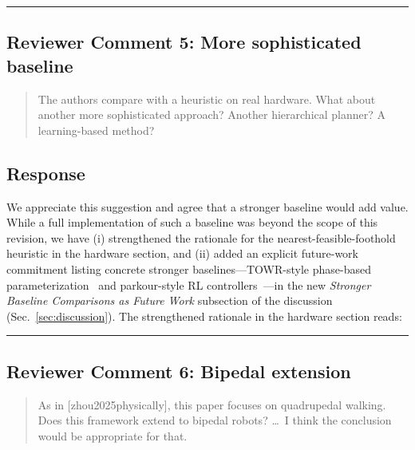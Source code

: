 \noindent\rule{17cm}{2.0pt}

\subsection{Reviewer Comment 5: More sophisticated baseline}
\begin{mdframed}
\begin{quote}
The authors compare with a heuristic on real hardware. What about another more sophisticated approach? Another hierarchical planner? A learning-based method?
\end{quote}
\end{mdframed}

\subsection{Response}
We appreciate this suggestion and agree that a stronger baseline would add value. While a full implementation of such a baseline was beyond the scope of this revision, we have (i) strengthened the rationale for the nearest-feasible-foothold heuristic in the hardware section, and (ii) added an explicit future-work commitment listing concrete stronger baselines---TOWR-style phase-based parameterization~\citep{winkler2018gait} and parkour-style RL controllers~\citep{zhuang2023robot,hoeller2023anymal,cheng2024extreme,luo2024pie}---in the new \textit{Stronger Baseline Comparisons as Future Work} subsection of the discussion (Sec.~\ref{sec:discussion}). The strengthened rationale in the hardware section reads:

\textit{}

\noindent\rule{17cm}{2.0pt}

\subsection{Reviewer Comment 6: Bipedal extension}
\begin{mdframed}
\begin{quote}
As in [zhou2025physically], this paper focuses on quadrupedal walking. Does this framework extend to bipedal robots? \ldots\ I think the conclusion would be appropriate for that.
\end{quote}
\end{mdframed}

